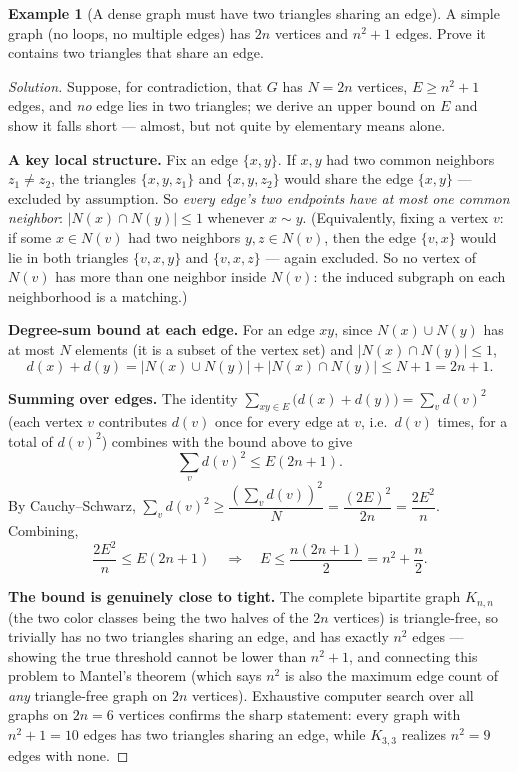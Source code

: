 \documentclass[11pt]{article}
\theoremstyle{definition}
\newtheorem{example}{Example}[section]
\begin{document}
\begin{example}[A dense graph must have two triangles sharing an edge]
A simple graph (no loops, no multiple edges) has $2n$ vertices and $n^2+1$ edges. Prove it contains two triangles that share an edge.
\end{example}

\begin{proof}[Solution]
Suppose, for contradiction, that $G$ has $N=2n$ vertices, $E\ge n^2+1$ edges, and \emph{no} edge lies in two triangles; we derive an upper bound on $E$ and show it falls short — almost, but not quite by elementary means alone.

\textbf{A key local structure.} Fix an edge $\{x,y\}$. If $x,y$ had two common neighbors $z_1\neq z_2$, the triangles $\{x,y,z_1\}$ and $\{x,y,z_2\}$ would share the edge $\{x,y\}$ — excluded by assumption. So \emph{every edge's two endpoints have at most one common neighbor}: $|N(x)\cap N(y)|\le1$ whenever $x\sim y$. (Equivalently, fixing a vertex $v$: if some $x\in N(v)$ had two neighbors $y,z\in N(v)$, then the edge $\{v,x\}$ would lie in both triangles $\{v,x,y\}$ and $\{v,x,z\}$ — again excluded. So no vertex of $N(v)$ has more than one neighbor inside $N(v)$: the induced subgraph on each neighborhood is a matching.)

\textbf{Degree-sum bound at each edge.} For an edge $xy$, since $N(x)\cup N(y)$ has at most $N$ elements (it is a subset of the vertex set) and $|N(x)\cap N(y)|\le1$,
\[
d(x)+d(y)=|N(x)\cup N(y)|+|N(x)\cap N(y)|\le N+1=2n+1.
\]

\textbf{Summing over edges.} The identity $\sum_{xy\in E}\bigl(d(x)+d(y)\bigr)=\sum_{v}d(v)^2$ (each vertex $v$ contributes $d(v)$ once for every edge at $v$, i.e.\ $d(v)$ times, for a total of $d(v)^2$) combines with the bound above to give
\[
\sum_v d(v)^2\le E(2n+1).
\]
By Cauchy--Schwarz, $\sum_v d(v)^2\ge\dfrac{\left(\sum_v d(v)\right)^2}{N}=\dfrac{(2E)^2}{2n}=\dfrac{2E^2}{n}$. Combining,
\[
\frac{2E^2}{n}\le E(2n+1)\quad\Longrightarrow\quad E\le\frac{n(2n+1)}2=n^2+\frac n2.
\]

\textbf{The bound is genuinely close to tight.} The complete bipartite graph $K_{n,n}$ (the two color classes being the two halves of the $2n$ vertices) is triangle-free, so trivially has no two triangles sharing an edge, and has exactly $n^2$ edges — showing the true threshold cannot be lower than $n^2+1$, and connecting this problem to Mantel's theorem (which says $n^2$ is also the maximum edge count of \emph{any} triangle-free graph on $2n$ vertices). Exhaustive computer search over all graphs on $2n=6$ vertices confirms the sharp statement: every graph with $n^2+1=10$ edges has two triangles sharing an edge, while $K_{3,3}$ realizes $n^2=9$ edges with none.


\end{proof}
\end{document}
